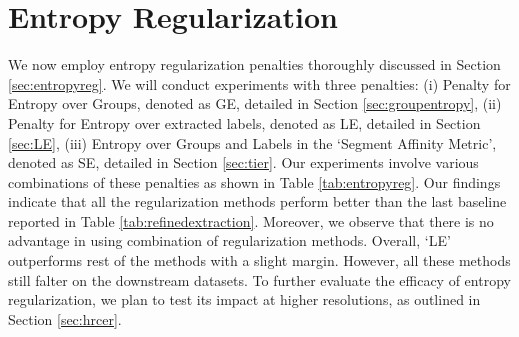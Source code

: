 \section{Entropy Regularization}
\label{ref:er}

We now employ entropy regularization penalties thoroughly discussed in Section \ref{sec:entropyreg}. We will conduct experiments with three penalties: (i) Penalty for Entropy over Groups, denoted as GE, detailed in Section \ref{sec:groupentropy}, (ii) Penalty for Entropy over extracted labels, denoted as LE, detailed in Section \ref{sec:LE}, (iii) Entropy over Groups and Labels in the `Segment Affinity Metric', denoted as SE, detailed in Section \ref{sec:tier}. Our experiments involve various combinations of these penalties as shown in Table \ref{tab:entropyreg}. Our findings indicate that all the regularization methods perform better than the last baseline reported in Table \ref{tab:refinedextraction}. Moreover, we observe that there is no advantage in using combination of regularization methods. Overall, `LE' outperforms rest of the methods with a slight margin. However, all these methods still falter on the downstream datasets. To further evaluate the efficacy of entropy regularization, we plan to test its impact at higher resolutions, as outlined in Section \ref{sec:hrcer}.




